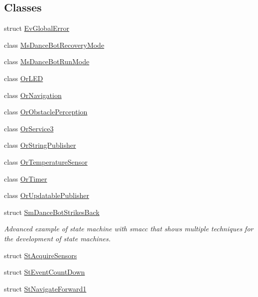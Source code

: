 \subsection*{Classes}
\begin{DoxyCompactItemize}
\item 
struct \hyperlink{structsm__dance__bot__strikes__back_1_1EvGlobalError}{Ev\+Global\+Error}
\item 
class \hyperlink{classsm__dance__bot__strikes__back_1_1MsDanceBotRecoveryMode}{Ms\+Dance\+Bot\+Recovery\+Mode}
\item 
class \hyperlink{classsm__dance__bot__strikes__back_1_1MsDanceBotRunMode}{Ms\+Dance\+Bot\+Run\+Mode}
\item 
class \hyperlink{classsm__dance__bot__strikes__back_1_1OrLED}{Or\+L\+ED}
\item 
class \hyperlink{classsm__dance__bot__strikes__back_1_1OrNavigation}{Or\+Navigation}
\item 
class \hyperlink{classsm__dance__bot__strikes__back_1_1OrObstaclePerception}{Or\+Obstacle\+Perception}
\item 
class \hyperlink{classsm__dance__bot__strikes__back_1_1OrService3}{Or\+Service3}
\item 
class \hyperlink{classsm__dance__bot__strikes__back_1_1OrStringPublisher}{Or\+String\+Publisher}
\item 
class \hyperlink{classsm__dance__bot__strikes__back_1_1OrTemperatureSensor}{Or\+Temperature\+Sensor}
\item 
class \hyperlink{classsm__dance__bot__strikes__back_1_1OrTimer}{Or\+Timer}
\item 
class \hyperlink{classsm__dance__bot__strikes__back_1_1OrUpdatablePublisher}{Or\+Updatable\+Publisher}
\item 
struct \hyperlink{structsm__dance__bot__strikes__back_1_1SmDanceBotStrikesBack}{Sm\+Dance\+Bot\+Strikes\+Back}
\begin{DoxyCompactList}\small\item\em Advanced example of state machine with smacc that shows multiple techniques for the development of state machines. \end{DoxyCompactList}\item 
struct \hyperlink{structsm__dance__bot__strikes__back_1_1StAcquireSensors}{St\+Acquire\+Sensors}
\item 
struct \hyperlink{structsm__dance__bot__strikes__back_1_1StEventCountDown}{St\+Event\+Count\+Down}
\item 
struct \hyperlink{structsm__dance__bot__strikes__back_1_1StNavigateForward1}{St\+Navigate\+Forward1}

\end{DoxyCompactItemize}
